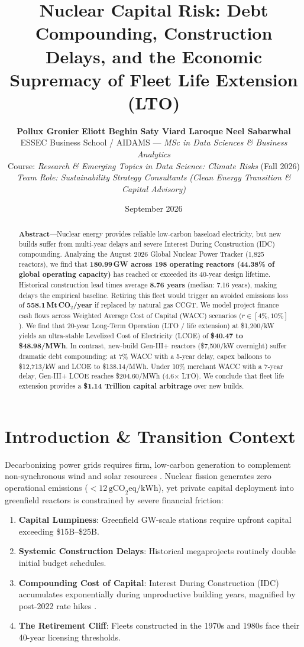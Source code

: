 \documentclass[10pt, twocolumn, a4paper]{article}
\title{\textbf{\Large Nuclear Capital Risk: Debt Compounding, Construction Delays, and the Economic Supremacy of Fleet Life Extension (LTO)}}
\author{
    \textbf{Pollux Gronier} \quad 
    \textbf{Eliott Beghin} \quad 
    \textbf{Saty Viard Laroque} \quad 
    \textbf{Neel Sabarwhal} \\[0.5em]
    \small ESSEC Business School / AIDAMS --- \textit{MSc in Data Sciences \& Business Analytics} \\
    \small Course: \textit{Research \& Emerging Topics in Data Science: Climate Risks} (Fall 2026) \\
    \small \textit{Team Role: Sustainability Strategy Consultants (Clean Energy Transition \& Capital Advisory)}
}
\date{September 2026}
\begin{document}
\maketitle

\begin{abstract}
\textbf{Abstract}---Nuclear energy provides reliable low-carbon baseload electricity, but new builds suffer from multi-year delays and severe Interest During Construction (IDC) compounding. Analyzing the August 2026 Global Nuclear Power Tracker (1,825 reactors), we find that \textbf{180.99\,GW across 198 operating reactors (44.38\% of global operating capacity)} has reached or exceeded its 40-year design lifetime. Historical construction lead times average \textbf{8.76 years} (median: 7.16 years), making delays the empirical baseline. Retiring this fleet would trigger an avoided emissions loss of \textbf{558.1\,Mt\,CO$_2$/year} if replaced by natural gas CCGT. We model project finance cash flows across Weighted Average Cost of Capital (WACC) scenarios ($r \in [4\%, 10\%]$). We find that 20-year Long-Term Operation (LTO / life extension) at \$1,200/kW yields an ultra-stable Levelized Cost of Electricity (LCOE) of \textbf{\$40.47 to \$48.98/MWh}. In contrast, new-build Gen-III+ reactors (\$7,500/kW overnight) suffer dramatic debt compounding: at 7\% WACC with a 5-year delay, capex balloons to \$12,713/kW and LCOE to \$138.14/MWh. Under 10\% merchant WACC with a 7-year delay, Gen-III+ LCOE reaches \$204.60/MWh (4.6$\times$ LTO). We conclude that fleet life extension provides a \textbf{\$1.14 Trillion capital arbitrage} over new builds.
\end{abstract}

\section{Introduction \& Transition Context}
Decarbonizing power grids requires firm, low-carbon generation to complement non-synchronous wind and solar resources \cite{ipcc2022mitigation}. Nuclear fission generates zero operational emissions ($<12\,\text{gCO}_2\text{eq/kWh}$), yet private capital deployment into greenfield reactors is constrained by severe financial friction:
\begin{enumerate}
    \item \textbf{Capital Lumpiness}: Greenfield GW-scale stations require upfront capital exceeding \$15B--\$25B.
    \item \textbf{Systemic Construction Delays}: Historical megaprojects routinely double initial budget schedules.
    \item \textbf{Compounding Cost of Capital}: Interest During Construction (IDC) accumulates exponentially during unproductive building years, magnified by post-2022 rate hikes \cite{damodaran2026wacc}.
    \item \textbf{The Retirement Cliff}: Fleets constructed in the 1970s and 1980s face their 40-year licensing thresholds.
\end{enumerate}
\end{document}
